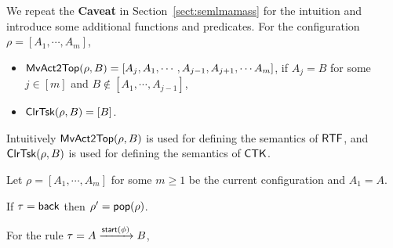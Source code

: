 
We repeat the \textbf{Caveat} in Section~\ref{sect:semlmamass} for the intuition and introduce some additional functions and predicates. 
For the configuration $\rho = [A_1,\cdots,A_m]$, 
\begin{itemize}
	\item $\mathsf{MvAct2Top}(\rho, B) = [A_j,A_1,\cdots,A_{j-1},A_{j+1},\cdots A_m]$, if $A_j = B$ for some $j\in[m]$ and $B\notin[A_1,\cdots,A_{j-1}]$,
	\item $\mathsf{ClrTsk}(\rho, B) = [B]$.
\end{itemize}

Intuitively $\mathsf{MvAct2Top}(\rho, B)$ is used for defining the semantics of ${\sf RTF}$, and $\mathsf{ClrTsk}(\rho, B)$ is used for defining the semantics of ${\sf CTK}$.

Let $\rho = [A_1,\cdots,A_m]$ for some $m\ge 1$ be the current configuration and $A_1 = A$. 

If $\tau = {\mathsf{back} }$ then $\rho' = \mathsf{pop}(\rho)$.

For the rule  $\tau = A\xrightarrow[]{{\mathsf{start} }(\phi)}B$,

